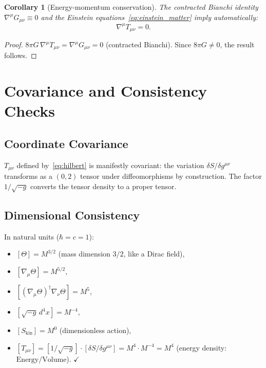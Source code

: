 \documentclass[12pt]{article}
\newtheorem{corollary}[definition]{Corollary}
\begin{document}
\begin{corollary}[Energy-momentum conservation]
\label{cor:conservation}
The contracted Bianchi identity $\nabla^\mu G_{\mu\nu} \equiv 0$ and the
Einstein equations~\eqref{eq:einstein_matter} imply automatically:
\begin{equation}
  \nabla^\mu T_{\mu\nu} = 0.
\end{equation}
\end{corollary}

\begin{proof}
$8\pi G\,\nabla^\mu T_{\mu\nu} = \nabla^\mu G_{\mu\nu} = 0$ (contracted Bianchi).
Since $8\pi G \neq 0$, the result follows.
\end{proof}

\section{Covariance and Consistency Checks}
\label{sec:checks}

\subsection{Coordinate Covariance}

$T_{\mu\nu}$ defined by~\eqref{eq:hilbert} is manifestly covariant: the
variation $\delta S/\delta g^{\mu\nu}$ transforms as a $(0,2)$ tensor under
diffeomorphisms by construction.  The factor $1/\sqrt{-g}$ converts the
tensor density to a proper tensor.

\subsection{Dimensional Consistency}

In natural units ($\hbar = c = 1$):
\begin{itemize}
  \item $[\Theta] = M^{3/2}$ (mass dimension $3/2$, like a Dirac field),
  \item $[\nabla_\mu\Theta] = M^{5/2}$,
  \item $[(\nabla_\mu\Theta)^\dagger\nabla_\nu\Theta] = M^5$,
  \item $[\sqrt{-g}\,d^4x] = M^{-4}$,
  \item $[S_{\mathrm{kin}}] = M^0$ (dimensionless action),
  \item $[T_{\mu\nu}] = [1/\sqrt{-g}]\cdot[\delta S/\delta g^{\mu\nu}]
                       = M^4\cdot M^{-4} = M^4$
                       (energy density: $\mathrm{Energy/Volume}$). $\checkmark$
\end{itemize}
\end{document}
